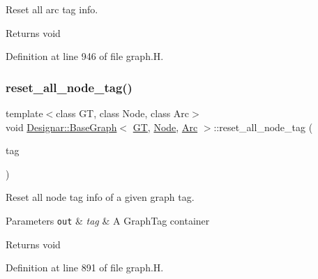 Reset all arc tag info. 

\begin{DoxyReturn}{Returns}
void 
\end{DoxyReturn}


Definition at line 946 of file graph.\+H.

\mbox{\label{class_designar_1_1_base_graph_a07ca1909d77210157b8b9571a4d35d6c}} 
\subsubsection{\texorpdfstring{reset\+\_\+all\+\_\+node\+\_\+tag()}{reset\_all\_node\_tag()}\hspace{0.1cm}{\footnotesize\ttfamily [1/2]}}
{\footnotesize\ttfamily template$<$class GT, class Node, class Arc$>$ \\
void \hyperlink{class_designar_1_1_base_graph}{Designar\+::\+Base\+Graph}$<$ \hyperlink{demo-buildgraph_8_c_a3001c40d2c31ca87ed96cd7d1334a55e}{GT}, \hyperlink{namespace_designar_a5af326c65aa2bd26b26c410f2030d09e}{Node}, \hyperlink{namespace_designar_a3f55fb5513d62ff47cbc8f72b8e95d6f}{Arc} $>$\+::reset\+\_\+all\+\_\+node\+\_\+tag (\begin{DoxyParamCaption}\item[{\hyperlink{namespace_designar_ac91366256ea6ea6ac5fd483d55a7499e}{Graph\+Tag}}]{tag }\end{DoxyParamCaption})\hspace{0.3cm}{\ttfamily [inline]}}



Reset all node tag info of a given graph tag. 


\begin{DoxyParams}[1]{Parameters}
\mbox{\tt out}  & {\em tag} & A Graph\+Tag container \\
\hline
\end{DoxyParams}
\begin{DoxyReturn}{Returns}
void 
\end{DoxyReturn}


Definition at line 891 of file graph.\+H.

\mbox{\label{class_designar_1_1_base_graph_a7bffa4f055b15f76d12bd7c40730a3dd}} 
